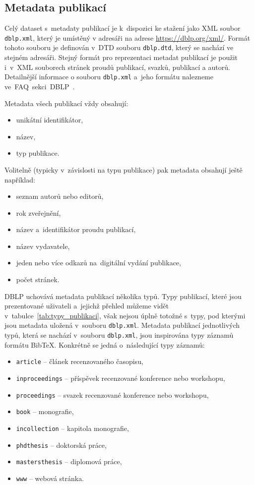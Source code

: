 \documentclass[
  biblatex,
  sourcecodes,
  glossaries,
  index
]{kidiplom}
\begin{document}
\subsection{Metadata publikací}

Celý dataset s~metadaty publikací je k~dispozici ke stažení jako XML soubor \texttt{dblp.xml}, který je umístěný v adresáři na adrese \href{https://dblp.org/xml/}{https://dblp.org/xml/}. Formát tohoto souboru je definován v~DTD souboru \texttt{dblp.dtd}, který se nachází ve stejném adresáři. Stejný formát pro reprezentaci metadat publikací je použit i~v~XML souborech stránek proudů publikací, svazků, publikací a autorů. Detailnější informace o souboru \texttt{dblp.xml} a~jeho formátu nalezneme ve~FAQ~sekci~DBLP~\cite{t10}.

Metadata všech publikací vždy obsahují:
\begin{itemize}
\item unikátní identifikátor,
\item název,
\item typ publikace.
\end{itemize}

Volitelně (typicky v~závislosti na typu publikace) pak metadata obsahují ještě například:
\begin{itemize}
\item seznam autorů nebo editorů,
\item rok zveřejnění,
\item název a~identifikátor proudu publikací,
\item název vydavatele,
\item jeden nebo více odkazů na~digitální vydání publikace,
\item počet stránek.
\end{itemize}

DBLP uchovává metadata publikací několika typů. Typy publikací, které jsou prezentované uživateli a~jejichž přehled můžeme vidět v~tabulce~\ref{tab:typy_publikaci}, však nejsou úplně totožné s~typy, pod kterými jsou metadata uložená v~souboru \texttt{dblp.xml}. Metadata publikací jednotlivých typů, která se nachází v~souboru \texttt{dblp.xml}, jsou inspirována typy záznamů formátu BibTeX. Konkrétně se jedná o~následující typy záznamů:
\begin{itemize}
\item \texttt{article} -- článek recenzovaného časopisu,
\item \texttt{inproceedings} -- příspěvek recenzované konference nebo workshopu,
\item \texttt{proceedings} -- svazek recenzované konference nebo workshopu,
\item \texttt{book} -- monografie,
\item \texttt{incollection} -- kapitola monografie,
\item \texttt{phdthesis} -- doktorská práce,
\item \texttt{mastersthesis} -- diplomová práce,
\item \texttt{www} -- webová stránka.
\end{itemize}
\end{document}
